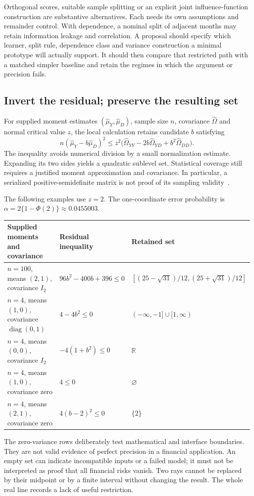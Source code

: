 Orthogonal scores, suitable sample splitting or an explicit joint
influence-function construction are substantive alternatives. Each needs
its own assumptions and remainder control. With dependence, a nominal
split of adjacent months may retain information leakage and correlation.
A proposal should specify which learner, split rule, dependence class and
variance construction a minimal prototype will actually support. It should
then compare that restricted path with a matched simpler baseline and retain
the regimes in which the argument or precision fails.

\subsection{Invert the residual; preserve the resulting set}

For supplied moment estimates $(\widehat\mu_Y,\widehat\mu_D)$, sample
size $n$, covariance $\widehat\Omega$ and normal critical value $z$,
the local calculation retains candidate $b$ satisfying
\begin{equation}
 n(\widehat\mu_Y-b\widehat\mu_D)^2
 \le z^2\bigl(
   \widehat\Omega_{YY}-2b\widehat\Omega_{YD}
      +b^2\widehat\Omega_{DD}\bigr).
 \label{exec13:funding-inversion}
\end{equation}
The inequality avoids numerical division by a small normalization estimate.
Expanding its two sides yields a quadratic sublevel set. Statistical coverage
still requires a justified moment approximation and covariance. In
particular, a serialized positive-semidefinite matrix is not proof of its
sampling validity~\citep{exec13_funding_service}.

The following examples use $z=2$. The one-coordinate error probability is
$\alpha=2\{1-\Phi(2)\}\approx0.0455003$.
\begin{center}
\small
\begin{tabular}{p{.31\linewidth}p{.28\linewidth}p{.29\linewidth}}
\toprule
Supplied moments and covariance & Residual inequality & Retained set\\
\midrule
$n=100$, means $(2,1)$, covariance $I_2$
& $96b^2-400b+396\le0$
& $[(25-\sqrt{31})/12,(25+\sqrt{31})/12]$\\[5pt]
$n=4$, means $(1,0)$, covariance $\operatorname{diag}(0,1)$
& $4-4b^2\le0$
& $(-\infty,-1]\cup[1,\infty)$\\[5pt]
$n=4$, means $(0,0)$, covariance $I_2$
& $-4(1+b^2)\le0$
& $\mathbb R$\\[5pt]
$n=4$, means $(1,0)$, covariance zero
& $4\le0$
& $\varnothing$\\[5pt]
$n=4$, means $(2,1)$, covariance zero
& $4(b-2)^2\le0$
& $\{2\}$\\
\bottomrule
\end{tabular}
\end{center}
The zero-variance rows deliberately test mathematical and interface
boundaries. They are not valid evidence of perfect precision in a financial
application. An empty set can indicate incompatible inputs or a failed
model; it must not be interpreted as proof that all financial risks vanish.
Two rays cannot be replaced by their midpoint or by a finite interval without
changing the result. The whole real line records a lack of useful restriction.

